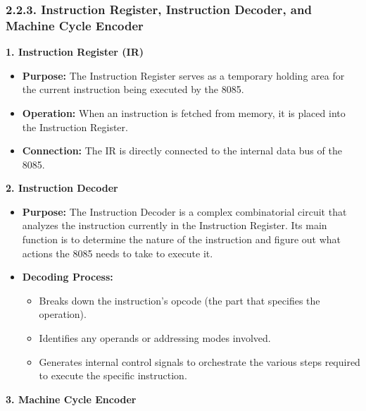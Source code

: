\documentclass[
]{article}
\begin{document}
\hypertarget{223-instruction-register-instruction-decoder-and-machine-cycle-encoder}{%
\subsubsection{2.2.3. Instruction Register, Instruction Decoder, and
Machine Cycle
Encoder}\label{223-instruction-register-instruction-decoder-and-machine-cycle-encoder}}

\textbf{1. Instruction Register (IR)}

\begin{itemize}
\item
  \textbf{Purpose:} The Instruction Register serves as a temporary
  holding area for the current instruction being executed by the 8085.
\item
  \textbf{Operation:} When an instruction is fetched from memory, it is
  placed into the Instruction Register.
\item
  \textbf{Connection:} The IR is directly connected to the internal data
  bus of the 8085.
\end{itemize}

\textbf{2. Instruction Decoder}

\begin{itemize}
\item
  \textbf{Purpose:} The Instruction Decoder is a complex combinatorial
  circuit that analyzes the instruction currently in the Instruction
  Register. Its main function is to determine the nature of the
  instruction and figure out what actions the 8085 needs to take to
  execute it.
\item
  \textbf{Decoding Process:}

  \begin{itemize}
  \item
    Breaks down the instruction's opcode (the part that specifies the
    operation).
  \item
    Identifies any operands or addressing modes involved.
  \item
    Generates internal control signals to orchestrate the various steps
    required to execute the specific instruction.
  \end{itemize}
\end{itemize}

\textbf{3. Machine Cycle Encoder}
\end{document}
